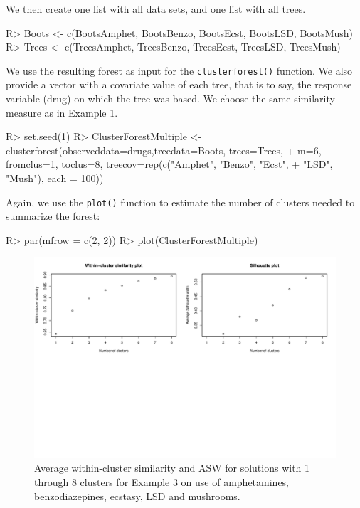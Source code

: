 We then create one list with all data sets, and one list with all trees.
\begin{example}
R> Boots <- c(BootsAmphet, BootsBenzo, BootsEcst, BootsLSD, BootsMush)
R> Trees <- c(TreesAmphet, TreesBenzo, TreesEcst, TreesLSD, TreesMush)
\end{example}

We use the resulting forest as input for the \texttt{clusterforest()} function. We also provide a vector with a covariate value of each tree, that is to say, the response variable (drug) on which the tree was based. We choose the same similarity measure as in Example 1.
\begin{example}
R> set.seed(1)
R> ClusterForestMultiple <- clusterforest(observeddata=drugs,treedata=Boots, trees=Trees, 
+    m=6, fromclus=1, toclus=8, treecov=rep(c("Amphet", "Benzo", "Ecst",
+    "LSD", "Mush"), each = 100)) 
\end{example}

Again, we use the \texttt{plot()} function to estimate the number of clusters needed to summarize the forest:
\begin{example}
R> par(mfrow = c(2, 2))
R> plot(ClusterForestMultiple) 
\end{example}

\begin{figure}[H]
	\centering
	\includegraphics[width=\linewidth, trim= 0 300 20 0, clip]{articleV3-plotnrclust}
	\caption{Average within-cluster similarity and ASW for solutions with 1 through 8 clusters for Example 3 on use of amphetamines, benzodiazepines, ecstasy, LSD and mushrooms.}
	\label{fig:Ex3Measures}	
\end{figure}

